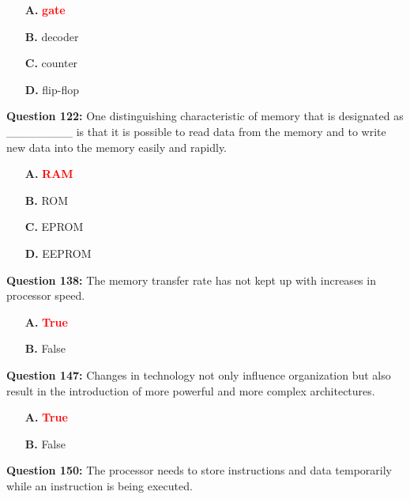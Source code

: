 \documentclass[12pt,a4paper]{article}
\begin{document}
\begin{itemize}
    \item[\textbf{A.}] \textcolor{red}{\textbf{gate}}
    \item[\textbf{B.}] decoder
    \item[\textbf{C.}] counter
    \item[\textbf{D.}] flip-flop
\end{itemize}

\vspace{0.5cm}

\textbf{Question 122:} One distinguishing characteristic of memory that is designated as ________ is that it is possible to read data from the memory and to write new data into the memory easily and rapidly.

\begin{itemize}
    \item[\textbf{A.}] \textcolor{red}{\textbf{RAM}}
    \item[\textbf{B.}] ROM
    \item[\textbf{C.}] EPROM
    \item[\textbf{D.}] EEPROM
\end{itemize}

\vspace{0.5cm}

\textbf{Question 138:} The memory transfer rate has not kept up with increases in processor speed.

\begin{itemize}
    \item[\textbf{A.}] \textcolor{red}{\textbf{True}}
    \item[\textbf{B.}] False
\end{itemize}

\vspace{0.5cm}

\textbf{Question 147:} Changes in technology not only influence organization but also result in the introduction of more powerful and more complex architectures.

\begin{itemize}
    \item[\textbf{A.}] \textcolor{red}{\textbf{True}}
    \item[\textbf{B.}] False
\end{itemize}

\vspace{0.5cm}

\textbf{Question 150:} The processor needs to store instructions and data temporarily while an instruction is being executed.
\end{document}
